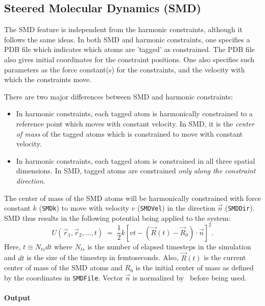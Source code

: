 \subsection{Steered Molecular Dynamics (SMD)}

The SMD feature is independent from the harmonic constraints, although it
follows the same ideas.  In both SMD and harmonic constraints, one specifies
a PDB file which indicates which atoms are 'tagged' as constrained.  The PDB
file also gives initial coordinates for the constraint positions.  One also
specifies such parameters as the force constant(s) for the constraints, 
and the velocity with which the constraints move.  

There are two major differences between SMD and
harmonic constraints:
\begin{itemize}
\item In harmonic constraints, each tagged atom is harmonically constrained
  to a reference point which moves with constant velocity.  In SMD, it is
  the {\em center of mass} of the tagged atoms which is constrained to move
  with constant velocity.

\item In harmonic constraints, each tagged atom is constrained in all three
  spatial dimensions.  In SMD, tagged atoms are constrained {\em only along
  the constraint direction}.
\end{itemize}

The center of mass of the SMD atoms will be harmonically constrained with 
force constant $k$ ({\tt SMDk}) to move with velocity $v$ ({\tt SMDVel}) in 
the direction $\vec n$ ({\tt SMDDir}).  SMD thus results in the following
potential being applied to the system:
\begin{equation}
\label{eq:SMDpotential}
U(\vec r_1, \vec r_2, ..., t) \; = \; \frac{1}{2} 
  k\left[vt - (\vec R(t) - \vec R_0)\cdot \vec n \right]^2.
\end{equation}
Here, $t \equiv N_{ts} dt$ where $N_{ts}$ is the number of elapsed timesteps
in the simulation and $dt$ is the size of the timestep in femtoseconds.
Also, $\vec R(t)$ is the current center of mass of the SMD atoms and $R_0$ is
the initial center of mass as defined by the coordinates in {\tt SMDFile}.
Vector $\vec n$ is normalized by \NAMD\ before being used.  

\paragraph*{Output}

